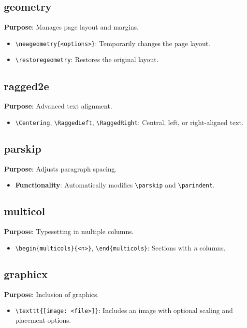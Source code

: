 \documentclass[12pt,twoside]{report}
\begin{document}
\subsection{geometry}
\textbf{Purpose}: Manages page layout and margins.
\begin{itemize}
    \item \verb|\newgeometry{<options>}|: Temporarily changes the page layout.
    \item \verb|\restoregeometry|: Restores the original layout.
\end{itemize}

\subsection{ragged2e}
\textbf{Purpose}: Advanced text alignment.
\begin{itemize}
    \item \verb|\Centering|, \verb|\RaggedLeft|, \verb|\RaggedRight|: Central, left, or right-aligned text.
\end{itemize}

\subsection{parskip}
\textbf{Purpose}: Adjusts paragraph spacing.
\begin{itemize}
    \item \textbf{Functionality}: Automatically modifies \verb|\parskip| and \verb|\parindent|.
\end{itemize}

\subsection{multicol}
\textbf{Purpose}: Typesetting in multiple columns.
\begin{itemize}
    \item \verb|\begin{multicols}{<n>}|, \verb|\end{multicols}|: Sections with \textit{n} columns.
\end{itemize}

\subsection{graphicx}
\textbf{Purpose}: Inclusion of graphics.
\begin{itemize}
    \item \verb|\texttt{[image: <file>]}|: Includes an image with optional scaling and placement options.
\end{itemize}
\end{document}
